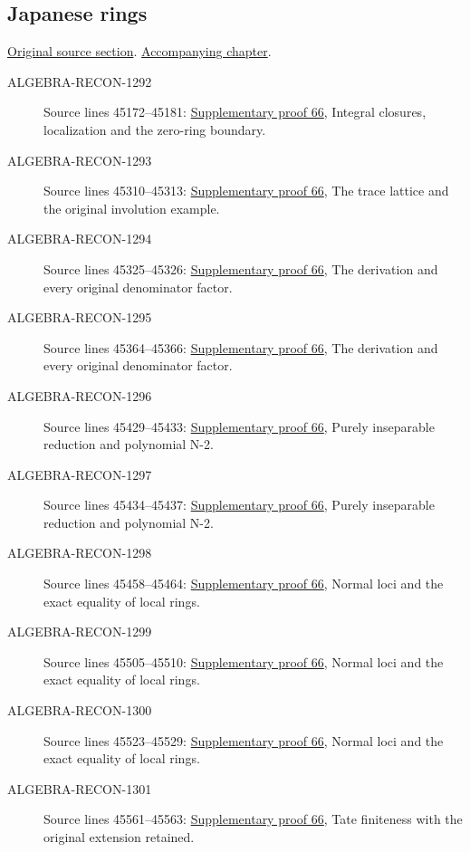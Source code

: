 \subsection{Japanese rings}
\hypertarget{algebra-source-section-japanese}{}
\noindent\href{https://github.com/stacks/stacks-project/blob/a04446e57ec1fbc252a871afcec7752fb2807b14/algebra.tex\#L45128}{Original source section}. \href{algebra.pdf\#nameddest=section-japanese}{Accompanying chapter}.

\begin{description}
\item[ALGEBRA-RECON-1292] Source lines 45172--45181: \hyperlink{algebra_japanese_notes_20260929}{Supplementary proof 66}, Integral closures, localization and the zero-ring boundary.
\item[ALGEBRA-RECON-1293] Source lines 45310--45313: \hyperlink{algebra_japanese_notes_20260929}{Supplementary proof 66}, The trace lattice and the original involution example.
\item[ALGEBRA-RECON-1294] Source lines 45325--45326: \hyperlink{algebra_japanese_notes_20260929}{Supplementary proof 66}, The derivation and every original denominator factor.
\item[ALGEBRA-RECON-1295] Source lines 45364--45366: \hyperlink{algebra_japanese_notes_20260929}{Supplementary proof 66}, The derivation and every original denominator factor.
\item[ALGEBRA-RECON-1296] Source lines 45429--45433: \hyperlink{algebra_japanese_notes_20260929}{Supplementary proof 66}, Purely inseparable reduction and polynomial N-2.
\item[ALGEBRA-RECON-1297] Source lines 45434--45437: \hyperlink{algebra_japanese_notes_20260929}{Supplementary proof 66}, Purely inseparable reduction and polynomial N-2.
\item[ALGEBRA-RECON-1298] Source lines 45458--45464: \hyperlink{algebra_japanese_notes_20260929}{Supplementary proof 66}, Normal loci and the exact equality of local rings.
\item[ALGEBRA-RECON-1299] Source lines 45505--45510: \hyperlink{algebra_japanese_notes_20260929}{Supplementary proof 66}, Normal loci and the exact equality of local rings.
\item[ALGEBRA-RECON-1300] Source lines 45523--45529: \hyperlink{algebra_japanese_notes_20260929}{Supplementary proof 66}, Normal loci and the exact equality of local rings.
\item[ALGEBRA-RECON-1301] Source lines 45561--45563: \hyperlink{algebra_japanese_notes_20260929}{Supplementary proof 66}, Tate finiteness with the original extension retained.
\end{description}

